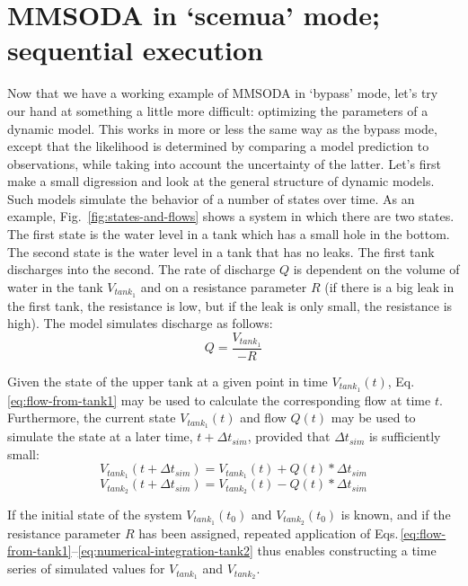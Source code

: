 
\section{MMSODA in `scemua' mode; sequential execution}

Now that we have a working example of MMSODA in `bypass' mode, let's try our hand at something a little more difficult: optimizing the parameters of a dynamic model. This works in more or less the same way as the bypass mode, except that the likelihood is determined by comparing a model prediction to observations, while taking into account the uncertainty of the latter. Let's first make a small digression and look at the general structure of dynamic models. Such models simulate the behavior of a number of states over time. As an example, Fig.~\ref{fig:states-and-flows} shows a system in which there are two states. The first state is the water level in a tank which has a small hole in the bottom. The second state is the water level in a tank that has no leaks. The first tank discharges into the second. The rate of discharge $Q$ is dependent on the volume of water in the tank $V_{tank_1}$ and on a resistance parameter $R$ (if there is a big leak in the first tank, the resistance is low, but if the leak is only small, the resistance is high). The model simulates discharge as follows:
\begin{equation}\label{eq:flow-from-tank1}
Q = \frac{V_{tank_1}}{-R}
\end{equation}

Given the state of the upper tank at a given point in time $V_{tank_1}(t)$, Eq.\,\ref{eq:flow-from-tank1} may be used to calculate the corresponding flow at time $t$. Furthermore, the current state $V_{tank_1}(t)$ and flow $Q(t)$ may be used to simulate the state at a later time, $t+\Delta{}t_{sim}$, provided that $\Delta{}t_{sim}$ is sufficiently small:
\begin{equation}\label{eq:numerical-integration-tank1}
V_{tank_1}(t+\Delta{}t_{sim}) = V_{tank_1}(t) + Q(t)*\Delta{}t_{sim}
\end{equation}
\begin{equation}\label{eq:numerical-integration-tank2}
V_{tank_2}(t+\Delta{}t_{sim}) = V_{tank_2}(t) - Q(t)*\Delta{}t_{sim}
\end{equation}

If the initial state of the system $V_{tank_1}(t_0)$ and $V_{tank_2}(t_0)$ is known, and if the resistance parameter $R$ has been assigned, repeated application of Eqs.\,\ref{eq:flow-from-tank1}--\ref{eq:numerical-integration-tank2} thus enables constructing a time series of simulated values for $V_{tank_1}$ and $V_{tank_2}$.

